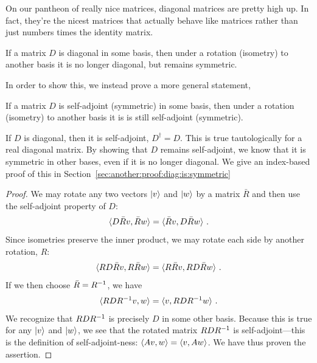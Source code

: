 \documentclass[12pt, oneside]{report}    %
\begin{document}
On our pantheon of really nice matrices, diagonal matrices are pretty high up. In fact, they're the nicest matrices that actually behave like matrices rather than just numbers times the identity matrix. 
\begin{bigidea}
If a matrix $D$ is diagonal in some basis, then under a rotation (isometry) to another basis it is no longer diagonal, but remains symmetric.
\end{bigidea}
In order to show this, we instead prove a more general statement,
\begin{theorem}\label{thm:symmetric:rotates:to:symmetric}
If a matrix $D$ is self-adjoint (symmetric) in some basis, then under a rotation (isometry) to another basis it is is still self-adjoint (symmetric).
\end{theorem} 
If $D$ is diagonal, then it is self-adjoint, $D^\dag = D$. This is true tautologically for a real diagonal matrix. By showing that $D$ remains self-adjoint, we know that it is symmetric in other bases, even if it is no longer diagonal. 
% 
We give an index-based proof of this in Section~\ref{sec:another:proof:diag:is:symmetric}
\begin{proof}
We may rotate any two vectors $\left|v\right\rangle$ and $\left|w\right\rangle$ by a matrix $\bar R$ and then use the self-adjoint property of $D$:
\begin{align}
    \langle D \bar R v, \bar R w \rangle
    =
    \langle  \bar R v, D \bar R w \rangle
    \ .
\end{align}
Since isometries preserve the inner product, we may rotate each side by another rotation, $R$:
\begin{align}
    \langle R D \bar R v,  R\bar R w \rangle
    =
    \langle R \bar R v, R D \bar R w \rangle
    \ .
\end{align}
If we then choose $\bar R = R^{-1}$, we have
\begin{align}
    \langle R D R^{-1}  v,  w \rangle
    =
    \langle v, R D R^{-1}  w \rangle \ .
\end{align}
We recognize that $RDR^{-1}$ is precisely $D$ in some other basis.
Because this is true for any $\left|v\right\rangle$ and $\left|w\right\rangle$, we see that the rotated matrix $RDR^{-1}$ is self-adjoint---this is the definition of self-adjoint-ness: $\langle A v,w \rangle = \langle v, Aw \rangle$. We have thus proven the assertion.
\end{proof}
\end{document}
